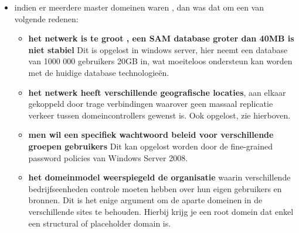 \begin{itemize}
\clearpage
\item indien er meerdere master domeinen waren , dan was dat om een van volgende redenen:
\begin{itemize}
\item \textbf{het netwerk is te groot , een SAM database groter dan 40MB is niet stabiel}
Dit is opgelost in windows server, hier neemt een database van 1000 000 gebruikers 20GB in, wat moeiteloos ondersteun kan worden met de huidige database technologie\"en. 
	
\item \textbf{het netwerk heeft verschillende geografische locaties}, aan elkaar gekoppeld door trage verbindingen waarover geen massaal replicatie verkeer tussen domeincontrollers gewenst is. Ook opgelost, zie hierboven.

\item \textbf{men wil een specifiek wachtwoord beleid voor verschillende groepen gebruikers} Dit kan opgelost worden door de fine-grained password policies van Windows Server 2008.

\item \textbf{het domeinmodel weerspiegeld de organisatie} waarin verschillende bedrijfseenheden controle moeten hebben over hun eigen gebruikers en bronnen. Dit is het enige argument om de aparte domeinen in de verschillende sites te behouden. Hierbij krijg je een root domein dat enkel een structural of placeholder domain is.
\end{itemize}
\end{itemize}
